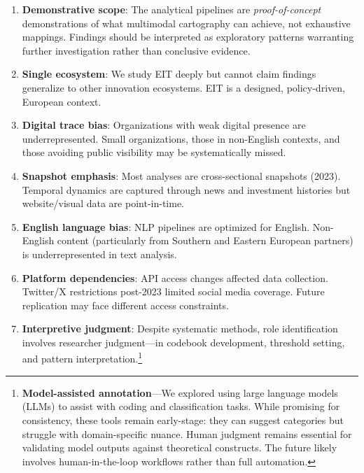 \documentclass[../main.tex]{subfiles}
\begin{document}
\begin{criticalbox}
\begin{enumerate}[leftmargin=*, itemsep=0.4em]
\item \textbf{Demonstrative scope}: The analytical pipelines are \emph{proof-of-concept} demonstrations of what multimodal cartography can achieve, not exhaustive mappings. Findings should be interpreted as exploratory patterns warranting further investigation rather than conclusive evidence.

\item \textbf{Single ecosystem}: We study EIT deeply but cannot claim findings generalize to other innovation ecosystems. EIT is a designed, policy-driven, European context.

\item \textbf{Digital trace bias}: Organizations with weak digital presence are underrepresented. Small organizations, those in non-English contexts, and those avoiding public visibility may be systematically missed.

\item \textbf{Snapshot emphasis}: Most analyses are cross-sectional snapshots (2023). Temporal dynamics are captured through news and investment histories but website/visual data are point-in-time.

\item \textbf{English language bias}: NLP pipelines are optimized for English. Non-English content (particularly from Southern and Eastern European partners) is underrepresented in text analysis.

\item \textbf{Platform dependencies}: API access changes affected data collection. Twitter/X restrictions post-2023 limited social media coverage. Future replication may face different access constraints.

\item \textbf{Interpretive judgment}: Despite systematic methods, role identification involves researcher judgment---in codebook development, threshold setting, and pattern interpretation.\footnote{\textbf{Model-assisted annotation}---We explored using large language models (LLMs) to assist with coding and classification tasks. While promising for consistency, these tools remain early-stage: they can suggest categories but struggle with domain-specific nuance. Human judgment remains essential for validating model outputs against theoretical constructs. The future likely involves human-in-the-loop workflows rather than full automation.}
\end{enumerate}
\end{criticalbox}
\end{document}
